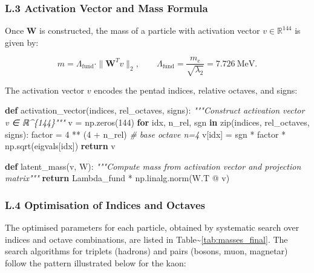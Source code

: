 \documentclass[11pt]{article}
\newenvironment{Shaded}{}{}
\newcommand{\BuiltInTok}[1]{\textcolor[rgb]{0.00,0.50,0.00}{#1}}
\newcommand{\CommentTok}[1]{\textcolor[rgb]{0.38,0.63,0.69}{\textit{#1}}}
\newcommand{\ControlFlowTok}[1]{\textcolor[rgb]{0.00,0.44,0.13}{\textbf{#1}}}
\newcommand{\DecValTok}[1]{\textcolor[rgb]{0.25,0.63,0.44}{#1}}
\newcommand{\KeywordTok}[1]{\textcolor[rgb]{0.00,0.44,0.13}{\textbf{#1}}}
\newcommand{\NormalTok}[1]{#1}
\newcommand{\OperatorTok}[1]{\textcolor[rgb]{0.40,0.40,0.40}{#1}}
\begin{document}
\hypertarget{l.3-activation-vector-and-mass-formula}{%
\subsubsection{L.3 Activation Vector and Mass
Formula}\label{l.3-activation-vector-and-mass-formula}}

Once \(\mathbf{W}\) is constructed, the mass of a particle with
activation vector \(v \in \mathbb{R}^{144}\) is given by:

\[
m = \Lambda_{\text{fund}} \cdot \|\mathbf{W}^T v\|_2, \qquad
\Lambda_{\text{fund}} = \frac{m_e}{\sqrt{\lambda_2}} = 7.726\ \text{MeV}.
\]

The activation vector \(v\) encodes the pentad indices, relative
octaves, and signs:

\begin{Shaded}
\begin{Highlighting}[]
\KeywordTok{def}\NormalTok{ activation\_vector(indices, rel\_octaves, signs):}
    \CommentTok{"""Construct activation vector v ∈ ℝ\^{}\{144\}"""}
\NormalTok{    v }\OperatorTok{=}\NormalTok{ np.zeros(}\DecValTok{144}\NormalTok{)}
    \ControlFlowTok{for}\NormalTok{ idx, n\_rel, sgn }\KeywordTok{in} \BuiltInTok{zip}\NormalTok{(indices, rel\_octaves, signs):}
\NormalTok{        factor }\OperatorTok{=} \DecValTok{4} \OperatorTok{**}\NormalTok{ (}\DecValTok{4} \OperatorTok{+}\NormalTok{ n\_rel)  }\CommentTok{\# base octave n=4}
\NormalTok{        v[idx] }\OperatorTok{=}\NormalTok{ sgn }\OperatorTok{*}\NormalTok{ factor }\OperatorTok{*}\NormalTok{ np.sqrt(eigvals[idx])}
    \ControlFlowTok{return}\NormalTok{ v}

\KeywordTok{def}\NormalTok{ latent\_mass(v, W):}
    \CommentTok{"""Compute mass from activation vector and projection matrix"""}
    \ControlFlowTok{return}\NormalTok{ Lambda\_fund }\OperatorTok{*}\NormalTok{ np.linalg.norm(W.T }\OperatorTok{@}\NormalTok{ v)}
\end{Highlighting}
\end{Shaded}

\hypertarget{l.4-optimisation-of-indices-and-octaves}{%
\subsubsection{L.4 Optimisation of Indices and
Octaves}\label{l.4-optimisation-of-indices-and-octaves}}

The optimised parameters for each particle, obtained by systematic
search over indices and octave combinations, are listed in
Table\textasciitilde{}\ref{tab:masses_final}. The search algorithms for
triplets (hadrons) and pairs (bosons, muon, magnetar) follow the pattern
illustrated below for the kaon:
\end{document}
